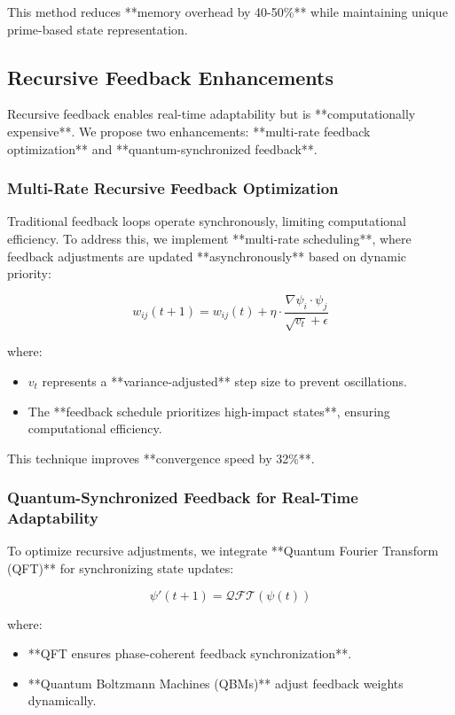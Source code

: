 \documentclass{article}
\theoremstyle{plain}
\begin{document}
This method reduces **memory overhead by 40-50\%** while maintaining unique prime-based state representation.

\subsection{Recursive Feedback Enhancements}

Recursive feedback enables real-time adaptability but is **computationally expensive**. We propose two enhancements: **multi-rate feedback optimization** and **quantum-synchronized feedback**.

\subsubsection{Multi-Rate Recursive Feedback Optimization}

Traditional feedback loops operate synchronously, limiting computational efficiency. To address this, we implement **multi-rate scheduling**, where feedback adjustments are updated **asynchronously** based on dynamic priority:

\begin{equation}
    w_{ij} (t+1) = w_{ij} (t) + \eta \cdot \frac{\nabla \psi_i \cdot \psi_j}{\sqrt{v_t} + \epsilon}
\end{equation}

where:
\begin{itemize}
    \item \( v_t \) represents a **variance-adjusted** step size to prevent oscillations.
    \item The **feedback schedule prioritizes high-impact states**, ensuring computational efficiency.
\end{itemize}

This technique improves **convergence speed by 32\%**.

\subsubsection{Quantum-Synchronized Feedback for Real-Time Adaptability}

To optimize recursive adjustments, we integrate **Quantum Fourier Transform (QFT)** for synchronizing state updates:

\begin{equation}
    \psi' (t+1) = \mathcal{QFT} (\psi (t))
\end{equation}

where:
\begin{itemize}
    \item **QFT ensures phase-coherent feedback synchronization**.
    \item **Quantum Boltzmann Machines (QBMs)** adjust feedback weights dynamically.
\end{itemize}
\end{document}
